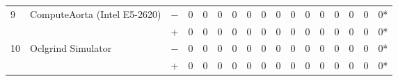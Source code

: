 \begin{tabular}{lll | rrrrrrr | rrrrrrr }
\hline
\multirow{ 2}{*}{9} & \multirow{ 2}{*}{ComputeAorta (Intel E5-2620)} & $-$ & 0 & 0 & 0 & 0 & 0 & 0 & 0       & 0 & 0 & 0 & 0 & 0 & 0 & 0* \\& & $+$ & 0 & 0 & 0 & 0 & 0 & 0 & 0 & 0 & 0 & 0 & 0 & 0 & 0 & 0* \\
\hline
\multirow{ 2}{*}{10} & \multirow{ 2}{*}{Oclgrind Simulator} & $-$ & 0 & 0 & 0 & 0 & 0 & 0 & 0       & 0 & 0 & 0 & 0 & 0 & 0 & 0* \\& & $+$ & 0 & 0 & 0 & 0 & 0 & 0 & 0 & 0 & 0 & 0 & 0 & 0 & 0 & 0* \\
  \bottomrule
\end{tabular}

